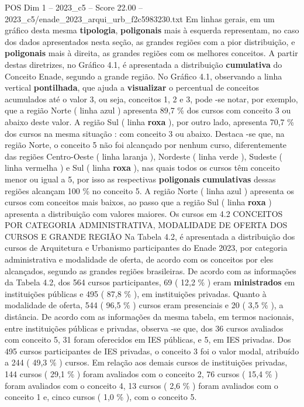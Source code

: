 \begin{textsample}{POS Dim 1 – 2023\_c5 – Score 22.00 – 2023\_c5/enade\_2023\_arqui\_urb\_f2c5983230.txt}
Em linhas gerais, em um gráfico desta mesma \textbf{tipologia}, \textbf{poligonais} mais à esquerda representam, no caso dos dados apresentados nesta seção, as grandes regiões com a pior distribuição, e \textbf{poligonais} mais à direita, as grandes regiões com os melhores conceitos.
A partir destas diretrizes, no Gráfico 4.1, é apresentada a distribuição \textbf{cumulativa} do Conceito Enade, segundo a grande região.
No Gráfico 4.1, observando a linha vertical \textbf{pontilhada}, que ajuda a \textbf{visualizar} o percentual de conceitos acumulados até o valor 3, ou seja, conceitos 1, 2 e 3, pode -se notar, por exemplo, que a região Norte ( linha azul ) apresenta 89,7 \% dos cursos com conceito 3 ou abaixo deste valor.
A região Sul ( linha \textbf{roxa} ), por outro lado, apresenta 70,7 \% dos cursos na mesma situação : com conceito 3 ou abaixo.
Destaca -se que, na região Norte, o conceito 5 não foi alcançado por nenhum curso, diferentemente das regiões Centro-Oeste ( linha laranja ), Nordeste ( linha verde ), Sudeste ( linha vermelha ) e Sul ( linha \textbf{roxa} ), nas quais todos os cursos têm conceito menor ou igual a 5, por isso as respectivas \textbf{poligonais} \textbf{cumulativas} dessas regiões alcançam 100 \% no conceito 5.
A região Norte ( linha azul ) apresenta os cursos com conceitos mais baixos, ao passo que a região Sul ( linha \textbf{roxa} ) apresenta a distribuição com valores maiores.
Os cursos em 4.2 CONCEITOS POR CATEGORIA ADMINISTRATIVA, MODALIDADE DE OFERTA DOS CURSOS E GRANDE REGIÃO Na Tabela 4.2, é apresentada a distribuição dos cursos de Arquitetura e Urbanismo participantes do Enade 2023, por categoria administrativa e modalidade de oferta, de acordo com os conceitos por eles alcançados, segundo as grandes regiões brasileiras.
De acordo com as informações da Tabela 4.2, dos 564 cursos participantes, 69 ( 12,2 \% ) eram \textbf{ministrados} em instituições públicas e 495 ( 87,8 \% ), em instituições privadas.
Quanto à modalidade de oferta, 544 ( 96,5 \% ) cursos eram presenciais e 20 ( 3,5 \% ), a distância.
De acordo com as informações da mesma tabela, em termos nacionais, entre instituições públicas e privadas, observa -se que, dos 36 cursos avaliados com conceito 5, 31 foram oferecidos em IES públicas, e 5, em IES privadas.
Dos 495 cursos participantes de IES privadas, o conceito 3 foi o valor modal, atribuído a 244 ( 49,3 \% ) cursos.
Em relação aos demais cursos de instituições privadas, 144 cursos ( 29,1 \% ) foram avaliados com o conceito 2, 76 cursos ( 15,4 \% ) foram avaliados com o conceito 4, 13 cursos ( 2,6 \% ) foram avaliados com o conceito 1 e, cinco cursos ( 1,0 \% ), com o conceito 5.

\end{textsample}
